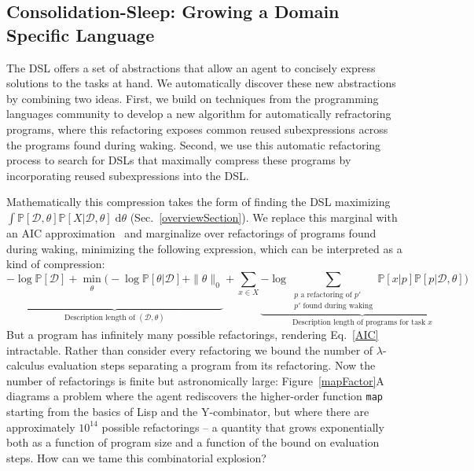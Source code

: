 \documentclass{article}
\newcommand{\code}[1]{{\footnotesize\texttt{#1}}}
\newcommand{\probability}{\mathds{P}} %
\begin{document}
\subsection{Consolidation-Sleep: Growing a Domain Specific Language}\label{consolidationSection}

The DSL offers a set of abstractions that allow an agent to concisely
express solutions to the tasks at hand. We automatically discover
these new abstractions by combining two ideas. First, we build on
techniques from the programming languages community to develop a new
algorithm for automatically refractoring programs, where this
refactoring exposes common reused subexpressions across the
programs found during waking.  Second, we use this automatic refactoring
process to search for DSLs that maximally compress these programs by
incorporating reused subexpressions into the DSL.

Mathematically this compression takes the form of
finding the DSL maximizing $\int \probability[\mathcal{D},\theta]\probability[X|\mathcal{D},\theta]\;\mathrm{d}\theta$ (Sec.~\ref{overviewSection}).
We replace this marginal with an AIC approximation~\cite{akaike1998information}
and marginalize over refactorings of programs found during waking, minimizing the following expression,
which can be interpreted as a kind of compression:
\begin{equation}
\underbrace{-\log \probability[\mathcal{D}] + \min_{\substack{\theta\\\\\\\\}}\Bigg(-\log
\probability[\theta|\mathcal{D}] + \|\theta\|_0}_{\text{Description length of }(\mathcal{D},\theta)} +\sum_{x\in
  X}\underbrace{-\log \sum_{\substack{p \text{ a refactoring of } p'\\ p'\text{ found during waking}}}\probability[x|p]\probability[p|\mathcal{D},\theta]}_{\text{Description length of programs for task }x}\Bigg)
\label{AIC}
\end{equation}
But a program has infinitely many possible refactorings, rendering
Eq.~\ref{AIC} intractable.  Rather than consider every refactoring we
bound the number of $\lambda$-calculus evaluation steps separating a
program from its refactoring.  Now the number of refactorings is
finite but astronomically large: Figure~\ref{mapFactor}A diagrams a
problem where the agent rediscovers the higher-order function
\code{map} starting from the basics of Lisp and the Y-combinator, but
where there are approximately $10^{14}$ possible refactorings -- a quantity
that grows exponentially both as a function of program size and a
function of the bound on evaluation steps. How can we tame this
combinatorial explosion?
\end{document}
